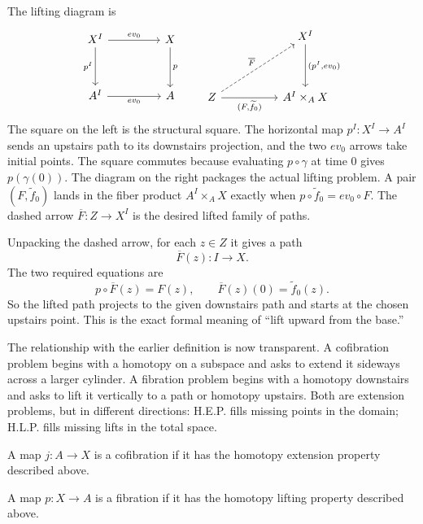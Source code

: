 The lifting diagram is
\[
\begin{tikzcd}[column sep=4.6em,row sep=3.4em]
X^I \arrow[r,"ev_0"] \arrow[d,"p^I"']
  & X \arrow[d,"p"] \\
A^I \arrow[r,"ev_0"']
  & A
\end{tikzcd}
\qquad
\begin{tikzcd}[column sep=5.0em,row sep=3.8em]
& X^I \arrow[d,"{(p^I,ev_0)}"] \\
Z \arrow[ur,dashed,"\overline F"] \arrow[r,"{(F,\widetilde f_0)}"']
  & A^I\times_A X
\end{tikzcd}
\]
The square on the left is the structural square.  The horizontal map \(p^I:X^I\to A^I\) sends an upstairs path to its downstairs projection, and the two \(ev_0\) arrows take initial points.  The square commutes because evaluating \(p\circ\gamma\) at time \(0\) gives \(p(\gamma(0))\).  The diagram on the right packages the actual lifting problem.  A pair \((F,\widetilde f_0)\) lands in the fiber product \(A^I\times_A X\) exactly when \(p\circ\widetilde f_0=ev_0\circ F\).  The dashed arrow \(\overline F:Z\to X^I\) is the desired lifted family of paths.

Unpacking the dashed arrow, for each \(z\in Z\) it gives a path
\[
  \overline F(z):I\to X.
\]
The two required equations are
\[
  p\circ \overline F(z)=F(z),
  \qquad
  \overline F(z)(0)=\widetilde f_0(z).
\]
So the lifted path projects to the given downstairs path and starts at the chosen upstairs point.  This is the exact formal meaning of ``lift upward from the base.''

The relationship with the earlier definition is now transparent.  A cofibration problem begins with a homotopy on a subspace and asks to extend it sideways across a larger cylinder.  A fibration problem begins with a homotopy downstairs and asks to lift it vertically to a path or homotopy upstairs.  Both are extension problems, but in different directions: H.E.P. fills missing points in the domain; H.L.P. fills missing lifts in the total space.

\begin{definition}
A map \(j:A\to X\) is a cofibration if it has the homotopy extension property described above.
\end{definition}

\begin{definition}
A map \(p:X\to A\) is a fibration if it has the homotopy lifting property described above.
\end{definition}

